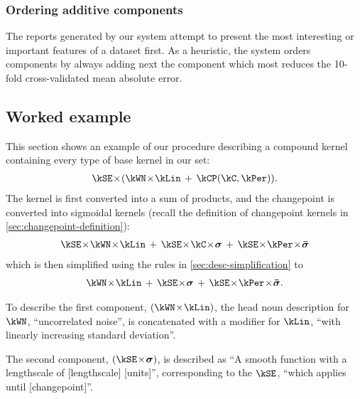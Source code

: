 

\subsubsection{Ordering additive components}

The reports generated by our system attempt to present the most interesting or important features of a dataset first.
As a heuristic, the system orders components by always adding next the component which most reduces the 10-fold cross-validated mean absolute error.



\subsection{Worked example}

This section shows an example of our procedure describing a compound kernel containing every type of base kernel in our set:
%
\begin{align}
\kSE \kerntimes (\kWN \kerntimes \kLin \kernplus \kCP(\kC, \kPer)).
\end{align}
%
The kernel is first converted into a sum of products, and the changepoint is converted into sigmoidal kernels (recall the definition of changepoint kernels in \cref{sec:changepoint-definition}):
%
\begin{align}
\kSE \kerntimes \kWN \kerntimes \kLin \kernplus 
\kSE \kerntimes \kC \kerntimes \boldsymbol{\sigma} \kernplus 
\kSE \kerntimes \kPer \kerntimes \boldsymbol{\bar\sigma}
\end{align}
%
which is then simplified using the rules in \cref{sec:desc-simplification} to
%
\begin{align}
\kWN \kerntimes \kLin \kernplus 
\kSE \kerntimes \boldsymbol{\sigma} \kernplus 
\kSE \kerntimes \kPer \kerntimes \boldsymbol{\bar\sigma}.
\end{align}

To describe the first component, $(\kWN \kerntimes \kLin)$, the head noun description for $\kWN$, ``uncorrelated noise'', is concatenated with a modifier for $\kLin$, ``with linearly increasing standard deviation''.

The second component, $(\kSE \kerntimes \vsigma)$, is described as ``A smooth function with a lengthscale of [lengthscale] [units]'', corresponding to the $\kSE$, ``which applies until [changepoint]''.

